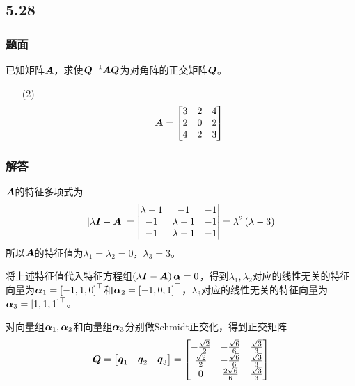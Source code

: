 \documentclass[9pt,xcolor=svgnames]{beamer} %
\begin{document}
\subsection*{5.28}
\begin{frame}
    \frametitle{题面}
    已知矩阵\(\boldsymbol{A}\)，求使\({\boldsymbol{Q}}^{-1}\boldsymbol{A}\boldsymbol{Q}\)为对角阵的正交矩阵\(\boldsymbol{Q}\)。
    \begin{enumerate}
        \item[(2)]
              {
              \begin{equation*}
                  \boldsymbol{A}=
                  \begin{bmatrix}
                      3 & 2 & 4 \\
                      2 & 0 & 2 \\
                      4 & 2 & 3
                  \end{bmatrix}
              \end{equation*}
              }
    \end{enumerate}
\end{frame}

\begin{frame}[allowframebreaks]
    \frametitle{解答}
    \(\boldsymbol{A}\)的特征多项式为
    \begin{equation*}
        \left|\lambda\boldsymbol{I}-\boldsymbol{A} \right|=\begin{vmatrix}\lambda-1&-1&-1\\-1&\lambda-1&-1\\-1&\lambda-1&-1\end{vmatrix}=\lambda^2\left( \lambda-3 \right)
    \end{equation*}
    所以\(\boldsymbol{A}\)的特征值为\(\lambda_1=\lambda_2=0\)，\(\lambda_3=3\)。

    将上述特征值代入特征方程组\(\left( \lambda\boldsymbol{I}-\boldsymbol{A} \right)\boldsymbol{\alpha}=0\)，得到\(\lambda_1,\lambda_2\)对应的线性无关的特征向量为\(\boldsymbol{\alpha}_1=\left[ -1,1,0 \right]^\top\)和\(\boldsymbol{\alpha}_2=\left[ -1,0,1 \right]^\top\)，\(\lambda_3\)对应的线性无关的特征向量为\(\boldsymbol{\alpha}_3=\left[ 1,1,1 \right]^\top\)。

    对向量组\(\boldsymbol{\alpha}_1,\boldsymbol{\alpha}_2\)和向量组\(\boldsymbol{\alpha}_3\)分别做Schmidt正交化，得到正交矩阵
    \begin{equation*}
        \boldsymbol{Q}=\begin{bmatrix}\boldsymbol{q}_1&\boldsymbol{q}_2&\boldsymbol{q}_3\end{bmatrix}=
        \begin{bmatrix}
            -\frac{\sqrt{2}}{2} & -\frac{\sqrt{6}}{6} & \frac{\sqrt{3}}{3} \\
            \frac{\sqrt{2}}{2}  & -\frac{\sqrt{6}}{6} & \frac{\sqrt{3}}{3} \\
            0                   & \frac{2\sqrt{6}}{6} & \frac{\sqrt{3}}{3}
        \end{bmatrix}
    \end{equation*}
\end{frame}
\end{document}
